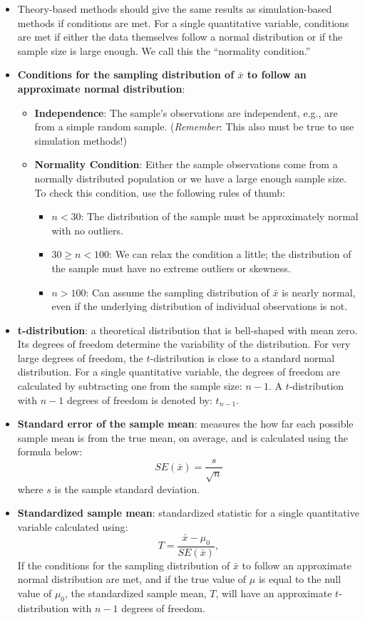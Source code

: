 \documentclass[
]{report}
\begin{document}
\begin{itemize}
\item
  Theory-based methods should give the same results as simulation-based methods if conditions are met. For a single quantitative variable, conditions are met if either the data themselves follow a normal distribution or if the sample size is large enough. We call this the ``normality condition.''
\item
  \textbf{Conditions for the sampling distribution of \(\bar{x}\) to follow an approximate normal distribution}:

  \begin{itemize}
  \item
    \textbf{Independence}: The sample's observations are independent, e.g., are from a simple random sample. (\emph{Remember}: This also must be true to use simulation methods!)
  \item
    \textbf{Normality Condition}: Either the sample observations come from a normally distributed population or we have a large enough sample size. To check this condition, use the following rules of thumb:

    \begin{itemize}
    \item
      \(n < 30\): The distribution of the sample must be approximately normal with no outliers.
    \item
      \(30 \ge n < 100\): We can relax the condition a little; the distribution of the sample must have no extreme outliers or skewness.
    \item
      \(n > 100\): Can assume the sampling distribution of \(\bar{x}\) is nearly normal, even if the underlying distribution of individual observations is not.
    \end{itemize}
  \end{itemize}
\item
  \textbf{t-distribution}: a theoretical distribution that is bell-shaped with mean zero. Its degrees of freedom determine the variability of the distribution. For very large degrees of freedom, the \(t\)-distribution is close to a standard normal distribution. For a single quantitative variable, the degrees of freedom are calculated by subtracting one from the sample size: \(n-1\). A \(t\)-distribution with \(n-1\) degrees of freedom is denoted by: \(t_{n-1}\).
\item
  \textbf{Standard error of the sample mean}: measures the how far each possible sample mean is from the true mean, on average, and is calculated using the formula below:
  \[SE(\bar{x})=\frac{s}{\sqrt{n}}\]
  where \(s\) is the sample standard deviation.
\item
  \textbf{Standardized sample mean}: standardized statistic for a single quantitative variable calculated using:
  \[
  T = \frac{\bar{x} - \mu_0}{SE(\bar{x})},
  \]
  If the conditions for the sampling distribution of \(\bar{x}\) to follow an approximate normal distribution are met, and if the true value of \(\mu\) is equal to the null value of \(\mu_0\), the standardized sample mean, \(T\), will have an approximate \(t\)-distribution with \(n-1\) degrees of freedom.
\end{itemize}
\end{document}
